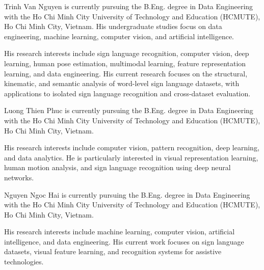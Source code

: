 \documentclass{ieeeaccess}
\begin{document}
\clearpage\mbox{}\clearpage

\begin{IEEEbiographynophoto}{Trinh Van Nguyen}
is currently pursuing the B.Eng. degree in Data Engineering with the Ho Chi
Minh City University of Technology and Education (HCMUTE), Ho Chi Minh City,
Vietnam. His undergraduate studies focus on data engineering, machine learning,
computer vision, and artificial intelligence.

His research interests include sign language recognition, computer vision, deep
learning, human pose estimation, multimodal learning, feature representation
learning, and data engineering. His current research focuses on the structural,
kinematic, and semantic analysis of word-level sign language datasets, with
applications to isolated sign language recognition and cross-dataset
evaluation.
\end{IEEEbiographynophoto}

\vspace{-8pt}

\begin{IEEEbiographynophoto}{Luong Thien Phuc}
is currently pursuing the B.Eng. degree in Data Engineering with the Ho Chi Minh
City University of Technology and Education (HCMUTE), Ho Chi Minh City,
Vietnam.

His research interests include computer vision, pattern recognition, deep
learning, and data analytics. He is particularly interested in visual
representation learning, human motion analysis, and sign language recognition
using deep neural networks.
\end{IEEEbiographynophoto}

\vspace{-8pt}


\begin{IEEEbiographynophoto}{Nguyen Ngoc Hai}
is currently pursuing the B.Eng. degree in Data Engineering with the Ho Chi Minh
City University of Technology and Education (HCMUTE), Ho Chi Minh City,
Vietnam.

His research interests include machine learning, computer vision, artificial
intelligence, and data engineering. His current work focuses on sign language
datasets, visual feature learning, and recognition systems for assistive
technologies.
\end{IEEEbiographynophoto}
\end{document}
